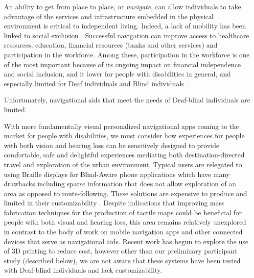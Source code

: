 

An ability to get from place to place, or \textit{navigate}, can allow individuals to take advantage of the  services and infrastructure embedded in the physical environment is critical to independent living. Indeed, a lack of mobility has been linked to social exclusion \cite{kenyon2002transport}.  Successful navigation can improve access to healthcare resources, education, financial resources (banks and other services) and participation in the workforce. Among these, participation in the workforce is one of the most important because of its ongoing impact on financial independence and social inclusion, and it lower for people with disabilities in general, and especially limited for Deaf individuals and Blind individuals \cite{zwerling2002workforce}.

Unfortunately,  navigational aids that meet the needs of  Deaf-blind individuals are limited.

With more fundamentally visual personalized navigational apps coming to the market for people with disabilities, we must consider how experiences for people with both vision and hearing loss can be sensitively designed to provide comfortable, safe and delightful experiences mediating both destination-directed travel and exploration of the urban environment. 
Typical users are relegated to using Braille displays for Blind-Aware phone applications which have many drawbacks including sparse information that does not allow exploration of an area as opposed to route-following.
These solutions are  expensive to produce and limited in their customizability \cite{rice2005design}. Despite indications that improving mass fabrication techniques for the production of tactile maps could be beneficial for people with both visual and hearing loss, this area remains relatively unexplored in contrast to the body of work on mobile navigation apps and other connected devices that serve as navigational aids.
Recent work has begun to explore the use of 3D printing to reduce cost, however other than our preliminary participant study (described below), we are not aware that these systems have been tested with Deaf-blind individuals and lack customizability. 

